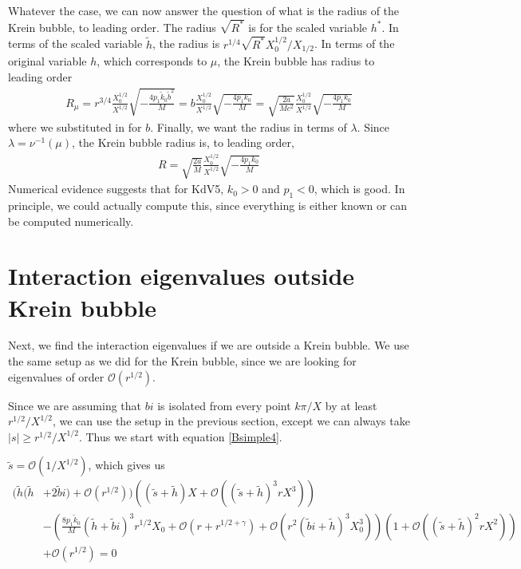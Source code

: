 \documentclass[thesis.tex]{subfiles}
\begin{document}
Whatever the case, we can now answer the question of what is the radius of the Krein bubble, to leading order. The radius $\sqrt{R^*}$ is for the scaled variable $h^*$. In terms of the scaled variable $\tilde{h}$, the radius is $r^{1/4} \sqrt{R^*} X_0^{1/2}/X_{1/2}$. In terms of the original variable $h$, which corresponds to $\mu$, the Krein bubble has radius to leading order
\begin{align*}
R_\mu = r^{3/4}\frac{X_0^{1/2}}{X^{1/2}} \sqrt{-\frac{4 p_1 \tilde{k}_0 \tilde{b}^2 }{M}} = b \frac{X_0^{1/2}}{X^{1/2}} \sqrt{-\frac{4 p_1 k_0 }{M}} 
= \sqrt{ \frac{2a}{M c^2} }  \frac{X_0^{1/2}}{X^{1/2}} \sqrt{-\frac{4 p_1 k_0 }{M}} 
\end{align*}
where we substituted in for $b$. Finally, we want the radius in terms of $\lambda$. Since $\lambda = \nu^{-1}(\mu)$, the Krein bubble radius is, to leading order,
\begin{align*}
R = \sqrt{ \frac{2a}{M} }  \frac{X_0^{1/2}}{X^{1/2}} \sqrt{-\frac{4 p_1 k_0 }{M}} 
\end{align*}
Numerical evidence suggests that for KdV5, $k_0 > 0$ and $p_1 < 0$, which is good. In principle, we could actually compute this, since everything is either known or can be computed numerically.

\section{Interaction eigenvalues outside Krein bubble}

Next, we find the interaction eigenvalues if we are outside a Krein bubble. We use the same setup as we did for the Krein bubble, since we are looking for eigenvalues of order $\mathcal{O}(r^{1/2})$. 

Since we are assuming that $bi$ is isolated from every point $k \pi / X$ by at least $r^{1/2}/X^{1/2}$, we can use the setup in the previous section, except we can always take $|s| \geq r^{1/2}/X^{1/2}$. Thus we start with equation \cref{Bsimple4}. 

 $\tilde{s} = \mathcal{O}(1/X^{1/2})$, which gives us
\begin{equation}\label{Binteig1}
\begin{aligned}
( \tilde{h}( \tilde{h} &+ 2 \tilde{b} i) + \mathcal{O}( r^{1/2} ))\left( (\tilde{s} + \tilde{h})X + \mathcal{O}\left( (\tilde{s} + \tilde{h})^3 r X^3 \right) \right) \\ 
&- \left(\frac{8 p_1 \tilde{k}_0}{M} ( \tilde{h} + \tilde{b}i)^3 r^{1/2} X_0 + \mathcal{O}(r + r^{1/2 + \gamma}) + \mathcal{O}(r^{2} (\tilde{b}i + \tilde{h})^3 X_0^3) \right)\left( 1 + \mathcal{O}\left( (\tilde{s} + \tilde{h})^2 r X^2 \right) \right) \\
&+ \mathcal{O}( r^{1/2} ) = 0
\end{aligned}
\end{equation} 
\end{document}
